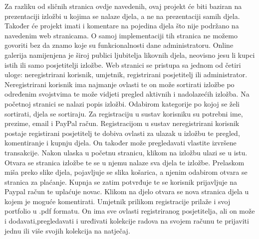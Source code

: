 		\vspace{10mm} 
			
		
		{Za razliku od sličnih stranica ovdje navedenih, ovaj projekt će biti baziran na prezentaciji izložbi u kojima se nalaze djela, a ne na prezentaciji samih djela. 
		Također će projekt 	imati i komentare na pojedina djela što nije podržano na navedenim web stranicama. O samoj implementaciji tih stranica ne možemo govoriti bez da znamo koje su funkcionalnosti dane administratoru.
		\newline Online galerija namijenjena je široj publici ljubitelja likovnih djela, neovisno jesu li kupci istih ili samo posjetitelji izložbe.
		\vspace{3mm}
		\newline Web stranici se pristupa sa jednom od četiri uloge: neregistrirani korisnik, umjetnik, registrirani posjetitelj ili administrator. Neregistrirani korisnik ima najmanje ovlasti te on može  sortirati izložbe po određenim svojstvima te može vidjeti pregled aktivnih i nadolazećih izložba. 
		\newline Na početnoj stranici se nalazi popis izložbi. Odabirom kategorije po kojoj se želi sortirati, djela se sortiraju.
		\newline Za registraciju u sustav korisniku su potrebni ime, prezime, email i PayPal račun.
		\vspace{3mm}
		\newline Registracijom u sustav neregistrirani korisnik postaje registirani posjetitelj te dobiva ovlasti za ulazak u izložbu te pregled, komentiranje i kupnju djela. On također može  pregledavati vlastite izvršene transakcije.
		\newline Nakon ulaska u početnu stranicu, klikom na izložbu ulazi se u istu. Otvara se stranica izložbe te se u njemu nalaze sva djela te izložbe.
		\newline Prelaskom miša preko slike djela, pojavljuje se slika košarica, a njenim odabirom otvara se stranica za plaćanje. Kupnja se zatim potvrđuje te se korisnik prijavljuje na Paypal račun te uplaćuje novac. 
		\newline Klikom na djelo otvara se nova stranica djela u kojem je moguće komentirati. 
		\vspace{3mm}
		\newline Umjetnik prilikom registracije prilaže i svoj portfolio u .pdf formatu. On ima sve ovlasti registriranog posjetitelja, ali on može i dodavati,pregledavati i uređivati kolekcije radova na svojem računu te prijaviti jednu ili više svojih kolekcija na natječaj.
}

